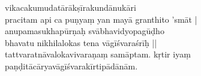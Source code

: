 \documentclass[12pt]{article}
\begin{document}
vikacakumudatārākṣīrakundānukāri\footnoteB{
	vikacakumudatārākṣīrakundānukāri \emd ; vikacakumudakṣīratārakundānukāri] \EDD ; vikarektāmudakṣīratārākundānukāri \MS
}\\
pracitam api ca puṇyaṃ yan mayā granthito 'smāt |\\
anupamasukhapūrṇaḥ svābhavidyopagūḍho\\
bhavatu nikhilalokas tena vāgīśvaraśrīḥ ||\\


% 
 
tattvaratnāvalokavivaraṇaṃ samāptam. kṛtir iyaṃ paṇḍitācāryavāgīśvarakīrtipādānām.\\

% 
 
\end{document}
